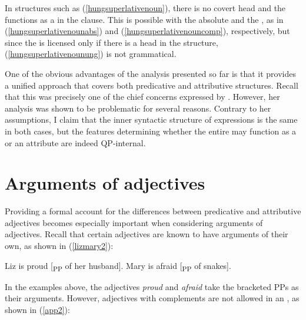 \ea \label{hungsuperlativenoun}
\z
\z

In structures such as (\ref{hungsuperlativenoun}), there is no covert  head and the  functions as a  in the clause. This is possible with the absolute and the , as in (\ref{hungsuperlativenounabs}) and (\ref{hungsuperlativenouncomp}), respectively, but since the  is licensed only if there is a  head in the structure, (\ref{hungsuperlativenounung}) is not grammatical.

One of the obvious advantages of the analysis presented so far is that it provides a unified approach that covers both predicative and attributive structures. Recall that this was precisely one of the chief concerns expressed by \citet{izvorski1995}. However, her analysis was shown to be problematic for several reasons. Contrary to her assumptions, I claim that the inner syntactic structure of  expressions is the same in both cases, but the features determining whether the entire  may function as a  or an attribute are indeed QP-internal.

\section{Arguments of adjectives} \label{sec:2arguments}
Providing a formal account for the differences between predicative and attributive adjectives becomes especially important when considering arguments of adjectives. Recall that certain adjectives are known to have arguments of their own, as shown in (\ref{lizmary2}):

\ea \label{lizmary2}
\ea	Liz is proud [\textsubscript{PP} of her husband].
\ex	Mary is afraid [\textsubscript{PP} of snakes].
\z
\z

In the examples above, the adjectives \textit{proud} and \textit{afraid} take the bracketed PPs as their arguments. However, adjectives with  complements are not allowed in an , as shown in (\ref{app2}):

